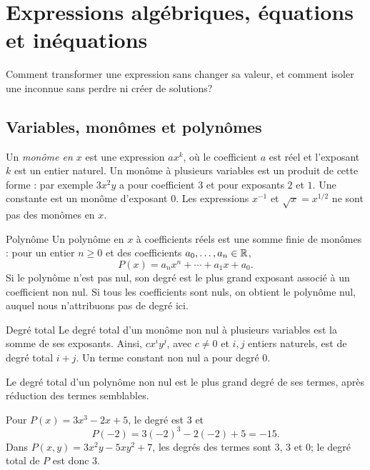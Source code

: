 \chapter{Expressions algébriques, équations et inéquations}
\label{manual:chapter:02}

\begin{questionbox}
Comment transformer une expression sans changer sa valeur, et comment isoler une inconnue sans perdre ni créer de solutions?
\end{questionbox}

\section{Variables, monômes et polynômes}
\label{manual:section:02.01}

Un \emph{monôme en $x$} est une expression $ax^k$, où le coefficient $a$ est réel et l'exposant $k$ est un entier naturel. Un monôme à plusieurs variables est un produit de cette forme : par exemple $3x^2y$ a pour coefficient $3$ et pour exposants $2$ et $1$. Une constante est un monôme d'exposant $0$. Les expressions $x^{-1}$ et $\sqrt x=x^{1/2}$ ne sont pas des monômes en $x$.

\begin{definition}{Polynôme}{}
Un polynôme en $x$ à coefficients réels est une somme finie de monômes : pour un entier $n\ge0$ et des coefficients $a_0,\ldots,a_n\in\mathbb{R}$,
\[
P(x)=a_nx^n+\cdots+a_1x+a_0.
\]
Si le polynôme n'est pas nul, son degré est le plus grand exposant associé à un coefficient non nul. Si tous les coefficients sont nuls, on obtient le polynôme nul, auquel nous n'attribuons pas de degré ici.
\end{definition}

\begin{definition}{Degré total}{}
Le degré total d'un monôme non nul à plusieurs variables est la somme de ses exposants. Ainsi, $cx^iy^j$, avec $c\ne0$ et $i,j$ entiers naturels, est de degré total $i+j$. Un terme constant non nul a pour degré $0$.

Le degré total d'un polynôme non nul est le plus grand degré de ses termes, après réduction des termes semblables.
\end{definition}

\begin{examplebox}
Pour $P(x)=3x^3-2x+5$, le degré est $3$ et
\[
P(-2)=3(-2)^3-2(-2)+5=-15.
\]
Dans $P(x,y)=3x^2y-5xy^2+7$, les degrés des termes sont $3$, $3$ et $0$; le degré total de $P$ est donc $3$.
\end{examplebox}

